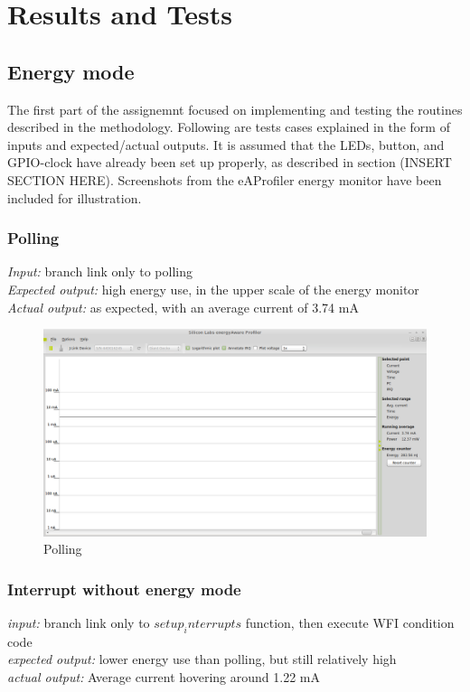 \section{Results and Tests}

\subsection{Energy mode}
The first part of the assignemnt focused on implementing and testing the routines described in the methodology. Following are tests cases explained in the form of inputs and expected/actual outputs. It is assumed that the LEDs, button, and GPIO-clock have already been set up properly, as described in section (INSERT SECTION HERE).
Screenshots from the eAProfiler energy monitor have been included for illustration.

	\subsubsection{Polling}
	\emph{Input: } branch link only to polling \\
	\emph{Expected output: } high energy use, in the upper scale of the energy monitor \\
	\emph{Actual output: } as expected, with an average current of 3.74 mA
	
	\begin{center}
		\begin{figure}[H]
			\includegraphics[width=\textwidth]{fig/polling.png}
			\caption{Polling}
		\end{figure}
	\end{center}
	
	
	\subsubsection{Interrupt without energy mode}
	\emph{input: } 
	branch link only to $setup_interrupts$ function, then execute WFI condition code \\
	\emph{expected output: }
	lower energy use than polling, but still relatively high \\
	\emph{actual output: }
	Average current hovering around 1.22 mA
	
